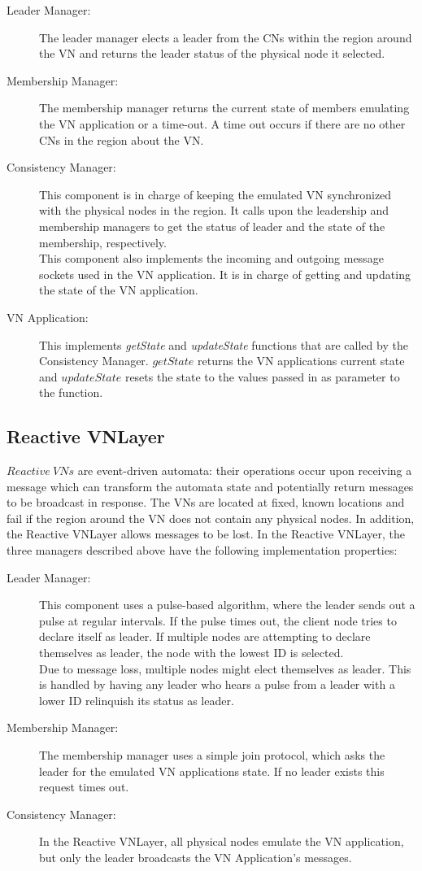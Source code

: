 \documentclass[12pt]{article}
\begin{document}
\begin{description}
\item[Leader Manager:] The leader manager elects a leader from the CNs within the region around the VN and returns the leader status of the physical node it selected.
\item[Membership Manager:] The membership manager returns the current state of members emulating the VN application or a time-out.  A time out occurs if there are no other CNs in the region about the VN.
\item[Consistency Manager:] This component is in charge of keeping the emulated VN synchronized with the physical nodes in the region. It calls upon the leadership and membership managers to get the status of leader and the state of the membership, respectively.\\ %
This component also implements the incoming and outgoing message sockets used in the VN application. It is in charge of getting and updating the state of the VN application.  

\item[VN Application:] This implements {\em getState} and {\em updateState} functions that are called by the Consistency Manager.  $getState$ returns the VN applications current state and $updateState$ resets the state to the values passed in as parameter to the function.  
\end{description}

\subsection{Reactive VNLayer}
$Reactive\ VNs$ are event-driven automata: their operations occur upon receiving a message which can transform the automata state and potentially return messages to be broadcast in response.  The VNs are located at fixed, known locations and fail if the region around the VN does not contain any physical nodes.  In addition, the Reactive VNLayer allows messages to be lost.  
In the Reactive VNLayer, the three managers described above have the following implementation properties: 
\begin{description}
\item[Leader Manager:] This component uses a pulse-based algorithm, where the leader sends out a pulse at regular intervals.  If the pulse times out, the client node tries to declare itself as leader.  If multiple nodes are attempting to declare themselves as leader, the node with the lowest ID is selected.  \\
Due to message loss, multiple nodes might elect themselves as leader. This is handled by having any leader who hears a pulse from a  leader with a lower ID relinquish its status as leader.  
\item[Membership Manager:] The membership manager uses a simple join protocol, which asks the leader for the emulated VN applications state.  If no leader exists this request times out. 
\item[Consistency Manager:]In the Reactive VNLayer, all physical nodes emulate the VN application, but only the leader broadcasts the VN Application's messages.  
\end{description}
\end{document}
